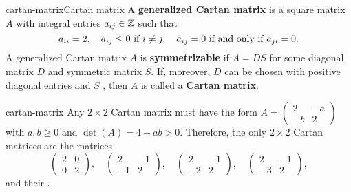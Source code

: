 \begin{topic}{cartan-matrix}{Cartan matrix}
    A \textbf{generalized Cartan matrix} is a square matrix $A$ with integral entries $a_{ij} \in \mathbb{Z}$ such that
    \[ a_{ii} = 2, \quad a_{ij} \le 0 \textup{ if } i \ne j, \quad a_{ij} = 0 \textup{ if and only if } a_{ji} = 0 . \]
    A generalized Cartan matrix $A$ is \textbf{symmetrizable} if $A = DS$ for some diagonal matrix $D$ and symmetric matrix $S$. If, moreover, $D$ can be chosen with positive diagonal entries and $S$ , then $A$ is called a \textbf{Cartan matrix}.
\end{topic}


\begin{example}{cartan-matrix}
    Any $2 \times 2$ Cartan matrix must have the form $A = \begin{pmatrix} 2 & -a \\ -b & 2 \end{pmatrix}$ with $a, b \ge 0$ and $\det(A) = 4 - ab > 0$. Therefore, the only $2 \times 2$ Cartan matrices are the matrices
    \[ \begin{pmatrix} 2 & 0 \\ 0 & 2 \end{pmatrix}, \quad \begin{pmatrix} 2 & -1 \\ -1 & 2 \end{pmatrix}, \quad \begin{pmatrix} 2 & -1 \\ -2 & 2 \end{pmatrix}, \quad \begin{pmatrix} 2 & -1 \\ -3 & 2 \end{pmatrix} , \]
    and their .
\end{example}

